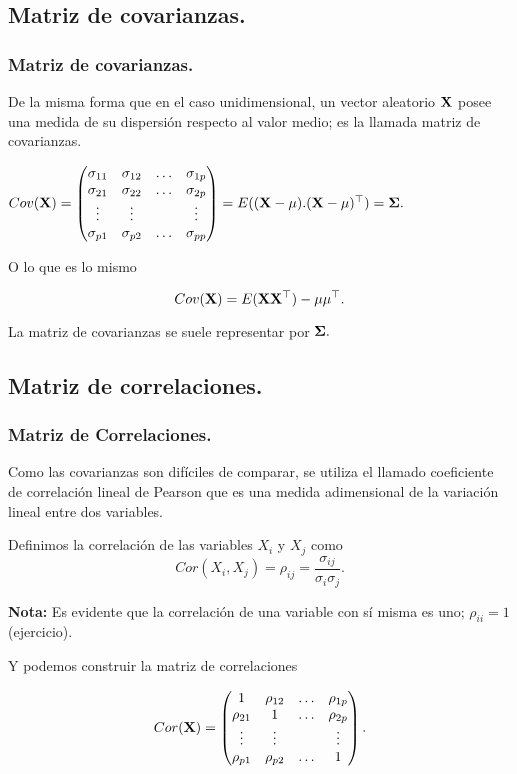 \subsection{Matriz de covarianzas.}
\begin{frame}
\frametitle{Matriz de covarianzas.}

De la misma forma que en el caso unidimensional, un vector aleatorio $\mathbf{X}$ posee  una medida de su dispersión respecto al valor medio; es la llamada matriz de covarianzas.


$Cov(\mathbf{X})=\begin{pmatrix} \sigma_{1 1} & \sigma_{1 2} & \ldots & \sigma_{1 p}\\
\sigma_{2 1} & \sigma_{2 2} & \ldots & \sigma_{2 p}\\
\vdots & \vdots &  & \vdots\\
\sigma_{p 1} & \sigma_{p 2} & \ldots & \sigma_{p p}\\
 \end{pmatrix}=E((\mathbf{X}-\mathbf{\mu}).(\mathbf{X}-\mathbf{\mu})^\top )=\mathbf{\Sigma}.$

 O lo que es lo mismo
 
$$Cov(\mathbf{X})=E(\mathbf{X}\mathbf{X}^\top )-\mathbf{\mu}\mathbf{\mu}^\top .$$

La matriz de covarianzas se suele representar por $\mathbf{\Sigma}.$

\end{frame}


\subsection{Matriz de correlaciones.}
\begin{frame}
\frametitle{Matriz de Correlaciones.}

Como las covarianzas son difíciles de comparar, se utiliza el llamado coeficiente de correlación lineal de Pearson que  es una medida adimensional de la variación lineal entre dos variables.


Definimos la correlación de las variables $X_i$ y $X_j$ como
$$Cor(X_i,X_j)=\rho_{i j}=\frac{\sigma_{i j}}{\sigma_{i} \sigma_{j}}.$$


\textbf{Nota:} Es evidente que la correlación de una variable con sí misma es uno; $\rho_{i i}=1$ (ejercicio).

Y podemos construir la matriz de correlaciones

$$Cor(\mathbf{X})=\begin{pmatrix} 1 & \rho_{1 2} & \ldots & \rho_{1 p}\\
\rho_{2 1} & 1 & \ldots & \rho_{2 p}\\
\vdots & \vdots &  & \vdots\\
\rho_{p 1} & \rho_{p 2} & \ldots & 1\\
 \end{pmatrix}.$$

\end{frame}


